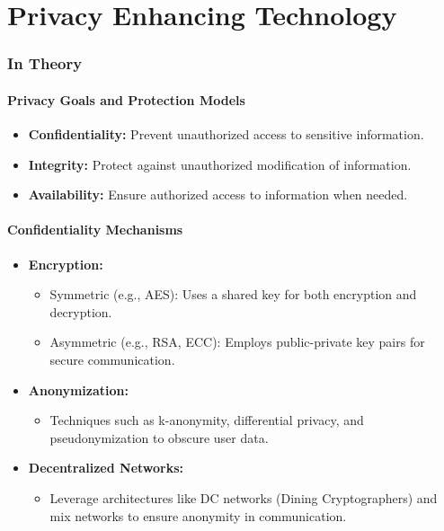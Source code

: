 \documentclass{article}
\author{Leopold Lemmermann}
\begin{document}
\createtitle

\part{Privacy Enhancing Technology}

\section{In Theory}

\subsection{Privacy Goals and Protection Models}
\begin{itemize}
    \item \textbf{Confidentiality:} Prevent unauthorized access to sensitive information.
    \item \textbf{Integrity:} Protect against unauthorized modification of information.
    \item \textbf{Availability:} Ensure authorized access to information when needed.
\end{itemize}

\subsection{Confidentiality Mechanisms}
\begin{itemize}
    \item \textbf{Encryption:}
    \begin{itemize}
        \item Symmetric (e.g., AES): Uses a shared key for both encryption and decryption.
        \item Asymmetric (e.g., RSA, ECC): Employs public-private key pairs for secure communication.
    \end{itemize}
    \item \textbf{Anonymization:}
    \begin{itemize}
        \item Techniques such as k-anonymity, differential privacy, and pseudonymization to obscure user data.
    \end{itemize}
    \item \textbf{Decentralized Networks:}
    \begin{itemize}
        \item Leverage architectures like DC networks (Dining Cryptographers) and mix networks to ensure anonymity in communication.
    \end{itemize}
\end{itemize}
\end{document}
